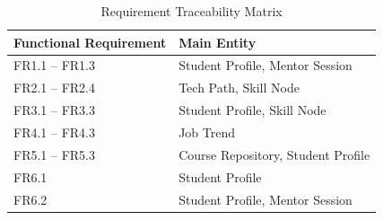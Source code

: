 \begin{table}[H]
\centering
\caption{Requirement Traceability Matrix}
\begin{tabular}{|l|l|}
\hline

\textbf{Functional Requirement} &
\textbf{Main Entity}
\\ \hline

FR1.1 -- FR1.3 &
Student Profile, Mentor Session
\\ \hline

FR2.1 -- FR2.4 &
Tech Path, Skill Node
\\ \hline

FR3.1 -- FR3.3 &
Student Profile, Skill Node
\\ \hline

FR4.1 -- FR4.3 &
Job Trend
\\ \hline

FR5.1 -- FR5.3 &
Course Repository, Student Profile
\\ \hline

FR6.1 &
Student Profile
\\ \hline

FR6.2 &
Student Profile, Mentor Session
\\ \hline

\end{tabular}
\end{table}